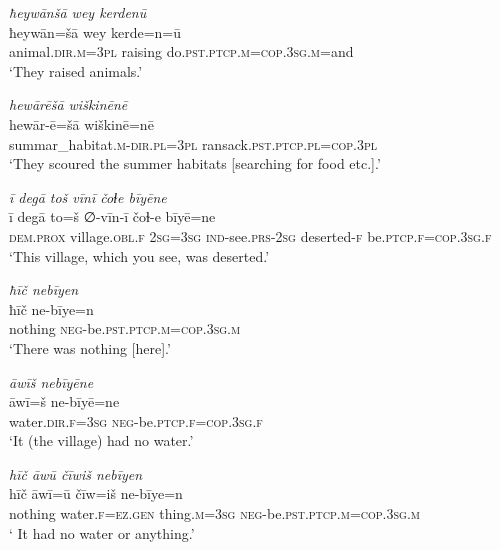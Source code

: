 \ea \label{ŽE.2}
\textit{ħeywānšā wey kerdenū} \\ 
\gll ħeywān=šā wey kerde=n=ū \\ 
 animal\textsc{.dir}\textsc{.m}\textsc{=3pl} raising do\textsc{.pst}\textsc{.ptcp}\textsc{.m}\textsc{=cop}\textsc{.3sg}\textsc{.m}=and \\ 
\glt `They raised animals.'
\z 
 
\ea \label{ŽE.3}
\textit{hewārēšā wiškinēnē} \\ 
\gll hewār-ē=šā wiškinē=nē \\ 
 summar\_habitat\textsc{.m}\textsc{-dir}\textsc{.pl}\textsc{=3pl} ransack\textsc{.pst}\textsc{.ptcp}\textsc{.pl}\textsc{=cop}\textsc{.3pl} \\ 
\glt `They scoured the summer habitats [searching for food etc.].'
\z 
 
\ea \label{ŽE.4}
\textit{ī degā toš vīnī čoɫe bīyēne} \\ 
\gll ī degā to=š ∅-vīn-ī čoɫ-e bīyē=ne \\ 
 \textsc{dem.prox} village\textsc{.obl}\textsc{\textsc{.f}} \textsc{2sg}\textsc{=3sg} \textsc{ind-}see\textsc{.prs}-\textsc{2sg} deserted-\textsc{f} be\textsc{.ptcp}\textsc{\textsc{.f}}\textsc{=cop}\textsc{.3sg}\textsc{\textsc{.f}} \\ 
\glt `This village, which you see, was deserted.'
\z 
 
\ea \label{ŽE.5}
\textit{ħīč nebīyen} \\ 
\gll ħīč ne-bīye=n \\ 
 nothing \textsc{neg-}be\textsc{.pst}\textsc{.ptcp}\textsc{.m}\textsc{=cop}\textsc{.3sg}\textsc{.m} \\ 
\glt `There was nothing [here].'
\z 
 
\ea \label{ŽE.6}
\textit{āwīš nebīyēne} \\ 
\gll āwī=š ne-bīyē=ne \\ 
 water\textsc{.dir}\textsc{.f}\textsc{=3sg} \textsc{neg-}be\textsc{.ptcp}\textsc{.f}\textsc{=cop}\textsc{.3sg}\textsc{.f} \\ 
\glt `It (the village) had no water.'
\z 
 
\ea \label{ŽE.7}
\textit{hīč āwū čīwiš nebīyen} \\ 
\gll hīč āwī=ū čīw=iš ne-bīye=n \\ 
 nothing water\textsc{.f}\textsc{\textsc{=ez.gen}} thing\textsc{.m}\textsc{=3sg} \textsc{neg-}be\textsc{.pst}\textsc{.ptcp}\textsc{.m}\textsc{=cop}\textsc{.3sg}\textsc{.m} \\ 
\glt ` It had no water or anything.'
\z 
 
